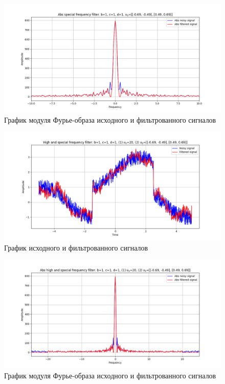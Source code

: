 \documentclass[a4paper, 12pt]{article}
\begin{document}
    \begin{figure}[!htb]
        \centering
        \includegraphics[scale=0.485]{5_1_abs_u_U_nospec.png}
        \captionsetup{skip=0pt}
        \caption{График модуля Фурье-образа исходного и фильтрованного сигналов}
        \label{fig:fig96}
    \end{figure}
    \begin{figure}[!htb]
        \centering
        \includegraphics[scale=0.485]{5_2_u_flt_u_nospec.png}
        \captionsetup{skip=0pt}
        \caption{График исходного и фильтрованного сигналов}
        \label{fig:fig97}
    \end{figure}
    \begin{figure}[!htb]
        \centering
        \includegraphics[scale=0.485]{5_2_abs_u_U_nospec.png}
        \captionsetup{skip=0pt}
        \caption{График модуля Фурье-образа исходного и фильтрованного сигналов}
        \label{fig:fig98}
    \end{figure}
\end{document}
